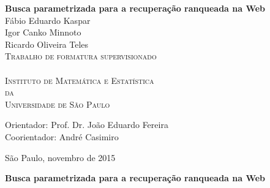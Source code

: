 \documentclass[11pt,oneside,a4paper]{book}
\begin{document}
\frontmatter 
\fancyhead[RO]{{\footnotesize\rightmark}\hspace{2em}\thepage}
\setcounter{tocdepth}{2}
\fancyhead[LE]{\thepage\hspace{2em}\footnotesize{\leftmark}}
\fancyhead[RE,LO]{}
\fancyhead[RO]{{\footnotesize\rightmark}\hspace{2em}\thepage}

\onehalfspacing  %

\thispagestyle{empty}
\begin{center}
    \vspace*{2.3cm}
    \textbf{\Large{Busca parametrizada para a recuperação ranqueada na Web}}\\
    
    \vskip 2cm
    \Large{Fábio Eduardo Kaspar} \\
    \Large{Igor Canko Minnoto} \\
    \Large{Ricardo Oliveira Teles} \\
    
    \vskip 2cm
    \textsc{
    Trabalho de formatura supervisionado\\ \\[-0.25cm] 
    \vskip 0.25cm
    Instituto de Matemática e Estatística\\[-0.25cm]
    da\\[-0.25cm]
    Universidade de São Paulo\\[-0.25cm]}

    \vskip 1.5cm
    Orientador: Prof. Dr. João Eduardo Fereira\\
    Coorientador: André Casimiro

   	\vskip 1cm
    
    \vskip 0.5cm
    \normalsize{São Paulo, novembro de 2015}
\end{center}

%
%
%
\newpage
\thispagestyle{empty}
    \begin{center}
        \vspace*{2.3 cm}
        \textbf{\Large{Busca parametrizada para a recuperação ranqueada na Web}}\\
        \vspace*{2 cm}
    \end{center}
\end{document}
